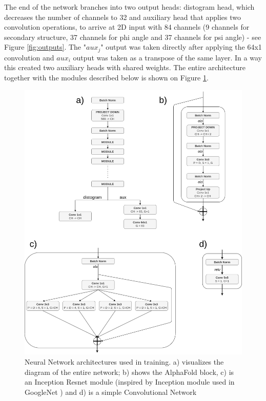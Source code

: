 The end of the network branches into two output heads: distogram head, which decreases the number of channels to 32 and auxiliary head that applies two convolution operations, to arrive at 2D input with 84 channels (9 channels for secondary structure, 37 channels for phi angle and 37 channels for psi angle) - see Figure \ref{fig:outputs}. The "$aux_j$" output was taken directly after applying the 64x1 convolution and $aux_i$ output was taken as a transpose of the same layer. In a way this created two auxiliary heads with shared weights. The entire architecture together with the modules described below is shown on Figure \ref{fig:architectures}.

\begin{figure}
    \centering
    \includegraphics[width=\linewidth]{imgs_tomas/Architectures.png}
    \caption{Neural Network architectures used in training. a) visualizes the diagram of the entire network; b) shows the AlphaFold block, c) is an Inception Resnet module (inspired by Inception module used in GoogleNet \cite{googlenet}) and d) is a simple Convolutional Network}
    \label{fig:architectures}
\end{figure}

